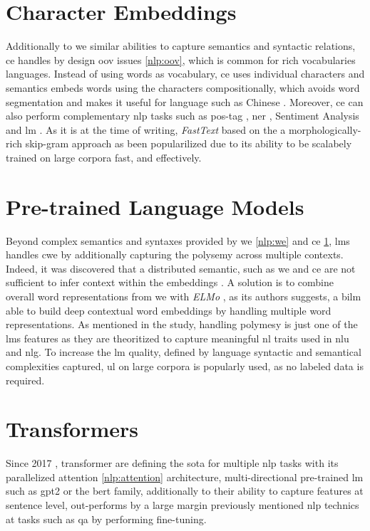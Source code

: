 \section{Character Embeddings}
\label{nlp:ce}
Additionally to \gls{we} similar abilities to capture semantics and syntactic relations, \gls{ce} handles by design \gls{oov} issues \ref{nlp:oov}, which is common for rich vocabularies languages. Instead of using words as vocabulary, \gls{ce} uses individual characters and semantics embeds words using the characters compositionally, which avoids word segmentation and makes it useful for language such as Chinese \autocite{paper:conf/ijcai/ChenXLSL15}. Moreover, \gls{ce} can also perform complementary \gls{nlp} tasks such as \gls{pos-tag} \autocite{paper:conf/icml/SantosZ14}, \gls{ner} \autocite{paper:ma-etal-2016-label}, Sentiment Analysis \autocite{paper:2017HaoYetal} and \gls{lm} \autocite{paper:journals/corr/KimJSR15}. As it is at the time of writing, \textit{FastText} based on the a morphologically-rich skip-gram approach \autocite{paper:journals/corr/BojanowskiGJM16} as been popularilized due to its ability to be scalabely trained on large corpora fast, and effectively. 


\section{Pre-trained Language Models}
\label{nlp-lm}
Beyond complex semantics and syntaxes provided by \gls{we} \ref{nlp:we} and \gls{ce} \ref{nlp:ce}, \glspl{lm} handles \gls{cwe} by additionally capturing the polysemy across multiple contexts. Indeed, it was discovered that a distributed semantic, such as \gls{we} and \gls{ce} are not sufficient to infer context within the embeddings \autocite{paper:journals/corr/LucyG17}. A solution is to combine overall word representations from \gls{we} with \textit{ELMo} \autocite{paper:journals/corr/abs-1802-05365}, as its authors suggests, a \gls{bilm} able to build deep contextual word embeddings by handling multiple word representations. As mentioned in the study, handling polymesy is just one of the \glspl{lm} features as they are theoritized to capture meaningful \gls{nl} traits used in \gls{nlu} and \gls{nlg}. To increase the \gls{lm} quality, defined by language syntactic and semantical complexities captured, \gls{ul} on large corpora is popularly used, as no labeled data is required.


\section{Transformers}
\label{nlp:transformers}
Since 2017 \autocite{paper:journals/corr/VaswaniSPUJGKP17}, transformer are defining the \gls{sota} for multiple \gls{nlp} tasks with its parallelized attention \ref{nlp:attention} architecture, multi-directional pre-trained \gls{lm} such as \gls{gpt2} or the \gls{bert} family, additionally to their ability to capture features at sentence level, out-performs by a large margin previously mentioned \gls{nlp} technics at tasks such as \gls{qa} by performing fine-tuning.


